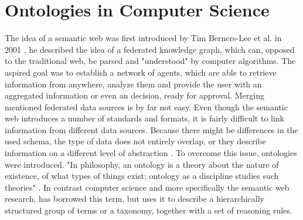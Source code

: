 \section{Ontologies in Computer Science}
	The idea of a semantic web was first introduced by Tim Berners-Lee et al. in 2001 \citep{Berners-Lee2001}, he described the idea of a federated knowledge graph, which can, opposed to the traditional web, be parsed and "understood" by computer algorithms. The aspired goal was to establish a network of agents, which are able to retrieve information from anywhere, analyze them and provide the user with an 
	aggregated information or even an decision, ready for approval.
	Merging mentioned federated data sources is by far not easy. Even though the semantic web introduces a number of standards and formats, it is fairly difficult to link information from different data sources. Because there might be differences in the used schema, the type of data does not entirely overlap, or they describe information on a different level of abstraction \citep{Berners-Lee2001}.
	To overcome this issue, ontologies were introduced. "In philosophy, an ontology is a theory about the nature of existence, of what types of things exist; ontology as a discipline studies such theories" \citep{Berners-Lee2001}.
	In contrast computer science and more specifically the semantic web research, has borrowed this term, but uses it to describe a hierarchically structured group of terms or a taxonomy, together with a set of reasoning rules.
	
